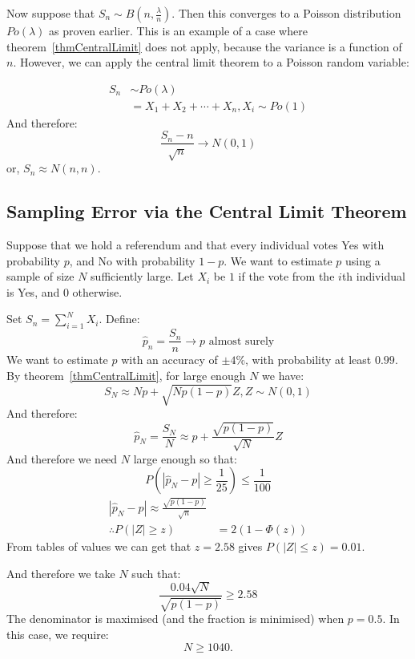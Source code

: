 \documentclass[../Main.tex]{subfiles}
\begin{document}
\begin{example}
    Now suppose that $S_n \sim B\left(n, \frac{\lambda}{n}\right)$. Then this converges to a Poisson distribution $Po(\lambda)$ as proven earlier. This is an example of a case where theorem~\ref{thmCentralLimit} does not apply, because the variance is a function of $n$. However, we can apply the central limit theorem to a Poisson random variable:
    
    \begin{align*}
        S_n &\sim Po(\lambda) \\
        &= X_1 + X_2 + \cdots + X_n, X_i \sim Po(1)
    \end{align*}
    And therefore:
    \begin{equation*}
        \frac{S_n - n}{\sqrt{n}} \to N(0, 1)
    \end{equation*}
    or, $S_n \approx N(n, n)$.
\end{example}
\subsection{Sampling Error via the Central Limit Theorem}
Suppose that we hold a referendum and that every individual votes Yes with probability $p$, and No with probability $1-p$. We want to estimate $p$ using a sample of size $N$ sufficiently large. Let $X_i$ be $1$ if the vote from the $i$th individual is Yes, and $0$ otherwise.

Set $S_n = \sum_{i = 1}^N X_i$. Define:
\begin{equation*}
    \hat{p}_n = \frac{S_n}{n} \to p \text{ almost surely}
\end{equation*}
We want to estimate $p$ with an accuracy of $\pm 4\%$, with probability at least $0.99$. By theorem~\ref{thmCentralLimit}, for large enough $N$ we have:
\begin{equation*}
    S_N \approx Np + \sqrt{Np(1-p)} Z, Z \sim N(0, 1)
\end{equation*}
And therefore:
\begin{equation*}
    \hat{p}_N = \frac{S_N}{N} \approx p + \frac{\sqrt{p(1-p)}}{\sqrt{N}} Z
\end{equation*}
And therefore we need $N$ large enough so that:
\begin{equation*}
    P\left(|\hat{p}_N - p| \geq \frac{1}{25}\right) \leq \frac{1}{100}
\end{equation*}
\begin{align*}
    |\hat{p}_N - p| \approx \frac{\sqrt{p(1-p)}}{\sqrt{n}} \\
    \therefore P(|Z| \geq z) &= 2(1 - \Phi(z))
\end{align*}
From tables of values we can get that $z = 2.58$ gives $P(|Z| \leq z) = 0.01$.

And therefore we take $N$ such that:
\begin{equation*}
    \frac{0.04\sqrt{N}}{\sqrt{p(1-p)}} \geq 2.58
\end{equation*}
The denominator is maximised (and the fraction is minimised) when $p = 0.5$. In this case, we require:
\begin{equation*}
    N \geq 1040.
\end{equation*}
\end{document}
